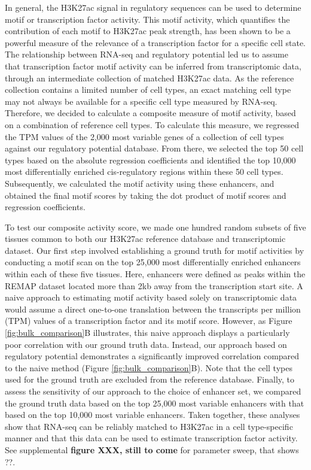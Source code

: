 In general, the H3K27ac signal in regulatory sequences can be used to determine motif or transcription factor activity\cite{FANTOM2009,Balwierz2014,Madsen_2017}. This motif activity, which quantifies the contribution of each motif to H3K27ac peak strength, has been shown to be a powerful measure of the relevance of a transcription factor for a specific cell state. The relationship between RNA-seq and regulatory potential led us to assume that transcription factor motif activity can be inferred from transcriptomic data, through an intermediate collection of matched H3K27ac data. As the reference collection contains a limited number of cell types, an exact matching cell type may not always be available for a specific cell type measured by RNA-seq. Therefore, we decided to calculate a composite measure of motif activity, based on a combination of reference cell types. To calculate this measure, we regressed the TPM values of the 2,000 most variable genes of a collection of cell types against our regulatory potential database. From there, we selected the top 50 cell types based on the absolute regression coefficients and identified the top 10,000 most differentially enriched cis-regulatory regions within these 50 cell types. Subsequently, we calculated the motif activity using these enhancers, and obtained the final motif scores by taking the dot product of motif scores and regression coefficients. 

To test our composite activity score, we made one hundred random subsets of five tissues common to both our H3K27ac reference database and transcriptomic dataset. Our first step involved establishing a ground truth for motif activities by conducting a motif scan on the top 25,000 most differentially enriched enhancers within each of these five tissues. Here, enhancers were defined as peaks within the REMAP dataset located more than 2kb away from the transcription start site. A naive approach to estimating motif activity based solely on transcriptomic data would assume a direct one-to-one translation between the transcripts per million (TPM) values of a transcription factor and its motif score. However, as Figure \ref{fig:bulk_comparison}B illustrates, this naive approach displays a particularly poor correlation with our ground truth data. Instead, our approach based on regulatory potential demonstrates a significantly improved correlation compared to the naive method (Figure \ref{fig:bulk_comparison}B). Note that the cell types used for the ground truth are excluded from the reference database. Finally, to assess the sensitivity of our approach to the choice of enhancer set, we compared the ground truth data based on the top 25,000 most variable enhancers with that based on the top 10,000 most variable enhancers. Taken together, these analyses show that RNA-seq can be reliably matched to H3K27ac in a cell type-specific manner and that this data can be used to estimate transcription factor activity. See supplemental \textbf{figure XXX, still to come} for parameter sweep, that shows ??. 

